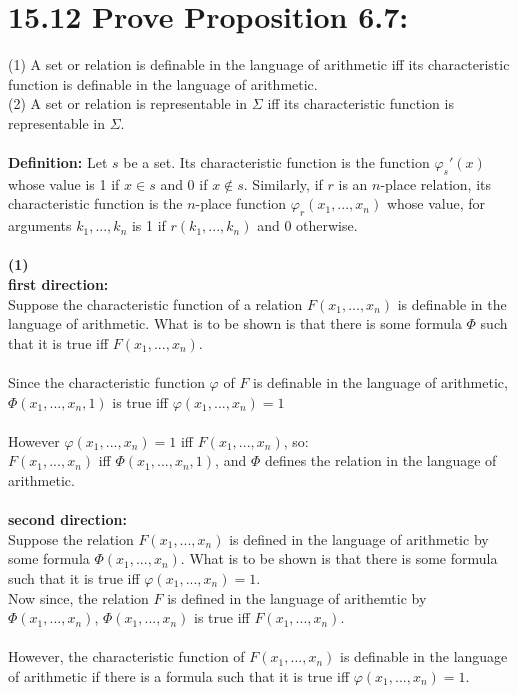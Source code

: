 \documentclass{article}
\begin{document}
\section*{15.12 Prove Proposition 6.7:}
(1) A set or relation is definable in the language of arithmetic iff its characteristic function is definable in the language of arithmetic.\\
(2) A set or relation is representable in $\Sigma$ iff its characteristic function is representable in  $\Sigma$.\\
\\
\textbf{Definition:} Let $s$ be a set. Its characteristic function is the function $\varphi_s'(x)$ whose value is 1 if $x \in s$ and 0 if $x \notin s$. Similarly, if $r$ is an $n$-place relation, its characteristic function is the $n$-place function $\varphi_r(x_1, . . . , x_n)$ whose value, for arguments $k_1,...,k_n$ is 1 if $r(k_1,...,k_n)$ and 0 otherwise.
\\\\
\textbf{(1)\\ first direction:}\\
Suppose the characteristic function of a relation $F(x_1, . . ., x_n)$ is definable in the language of arithmetic. What is to be shown is that there is some formula $\Phi$ such that it is true iff $F(x_1, . . ., x_n)$.\\\\
Since the characteristic function $\varphi$ of $F$ is definable in the language of arithmetic, $\Phi(x_1,...,x_n,1)$ is true iff $\varphi(x_1,...,x_n) = 1$\\\\
However $\varphi(x_1,...,x_n) = 1$ iff $F(x_1, . . ., x_n)$, so:\\
$F(x_1, . . ., x_n)$ iff $\Phi(x_1,...,x_n,1)$, and $\Phi$ defines the relation in the language of arithmetic.\\\\
\textbf{second direction:}\\
Suppose the relation $F(x_1, . . ., x_n)$ is defined in the language of arithmetic by some formula $\Phi(x_1,...,x_n)$. What is to be shown is that there is some formula such that it is true iff $\varphi(x_1, . . ., x_n) = 1$.\\
Now since, the relation $F$ is defined in the language of arithemtic by $\Phi(x_1,...,x_n)$, $\Phi(x_1,...,x_n)$ is true iff $F(x_1, . . ., x_n)$.\\\\
However, the characteristic function of $F(x_1, . . ., x_n)$ is definable in the language of arithmetic if there is a formula such that it is true iff $\varphi(x_1, . . ., x_n) = 1$. \\\\
\end{document}
